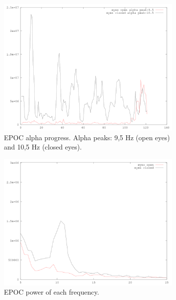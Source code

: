 \documentclass[a4paper,10pt,english,lof,lot,twoside]{puthesis}
\begin{document}
\begin{figure}
\centering
\capstart
\begin{subfigure}[t]{0.49\linewidth}
\centering
\capstart

\includegraphics[width=1.000\linewidth]{experiment-final-7-epoc-alpha-progress.png}
\caption[EPOC alpha progress.]{EPOC alpha progress. Alpha peaks: 9,5 Hz (open eyes) and 10,5 Hz (closed eyes).}\label{ch-experiment/index:fig-experiment-final-7-emotiv-alpha-progress}\end{subfigure}
\begin{subfigure}[t]{0.49\linewidth}
\centering
\capstart

\includegraphics[width=1.000\linewidth]{experiment-final-7-epoc-pwelch-power.png}
\caption[EPOC (pwelch) power.]{EPOC power of each frequency.}\label{ch-experiment/index:fig-experiment-final-7-emotiv-alpha-power}\end{subfigure}
\begin{subfigure}[t]{0.49\linewidth}
\centering
\capstart


\end{subfigure}
\end{figure}
\end{document}
